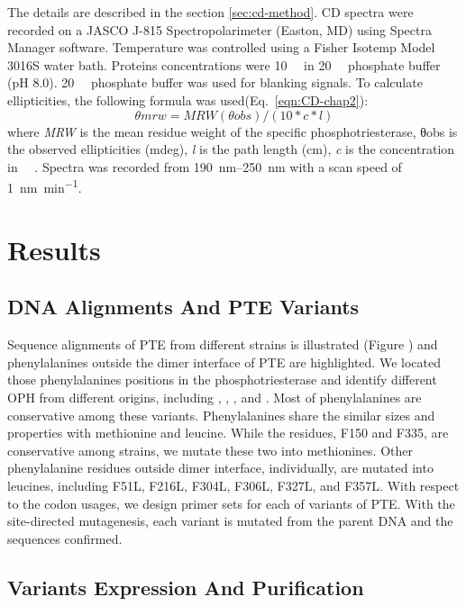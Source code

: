 \begin{refsection}
The details are described in the section \ref{sec:cd-method}. CD spectra were
recorded on a JASCO J-815 Spectropolarimeter (Easton, MD) using Spectra Manager
software. Temperature was controlled using a Fisher Isotemp Model 3016S water
bath. Proteins concentrations were \SI{10}{\micro\Molar} in
\SI{20}{\milli\Molar} phosphate buffer (pH 8.0). \SI{20}{\milli\Molar}
phosphate buffer was used for blanking signals. To calculate ellipticities, the
following formula was used(Eq.~\ref{eqn:CD-chap2}): 
\begin{equation}
    θmrw = MRW(θobs) / (10 * c * l)
    \label{eqn:CD-chap2}
\end{equation}
where \emph{MRW} is the mean residue weight of the specific phosphotriesterase,
θobs is the observed ellipticities (mdeg), \emph{l} is the path length (cm),
\emph{c} is the concentration in \SI{}{\micro\Molar}. Spectra was recorded from
\SIrange{190}{250}{\nm} with a scan speed of \SI{1}{\nano\meter\per\minute}.

\section{Results}

\subsection{DNA Alignments And PTE Variants}

Sequence alignments of PTE from different strains is illustrated (Figure ) and
phenylalanines outside the dimer interface of PTE are highlighted. We located
those phenylalanines positions in the phosphotriesterase and identify different
OPH from different origins, including  ,
, , and . Most
of phenylalanines are conservative among these variants. Phenylalanines share
the similar sizes and properties with methionine and leucine. While the
residues, F150 and F335, are conservative among strains, we mutate these two
into methionines. Other phenylalanine residues outside dimer interface,
individually, are mutated into leucines, including F51L, F216L, F304L, F306L,
F327L, and F357L. With respect to the codon usages, we design primer sets for
each of variants of PTE. With the site-directed mutagenesis,
each variant is mutated from the parent DNA and the sequences  confirmed.

\subsection{Variants Expression And Purification}


\end{refsection}
